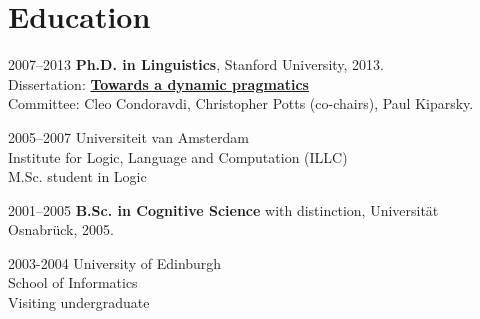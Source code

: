 \section*{Education} 
\begin{dated} 
	\item[2007--2013] 
		\textbf{Ph.D. in Linguistics}, Stanford University, 2013.\\
		Dissertation: \href{http://sven-lauer.net/output/Lauer-Dissertation-DynamicPragmatics.pdf}{\textbf{Towards a dynamic pragmatics}}\\
		Committee: Cleo Condoravdi, Christopher Potts (co-chairs), Paul Kiparsky.
	\item[2005--2007]
		Universiteit van Amsterdam\\
		Institute for Logic, Language and Computation (ILLC)\\
		M.Sc. student in Logic
	\item[2001--2005] 
		\textbf{B.Sc. in Cognitive Science} with distinction, {Universit\"at Osnabr\"uck}, 2005. 
	\item[2003-2004]
		University of Edinburgh\\
		School of Informatics\\
		Visiting undergraduate 
\end{dated}